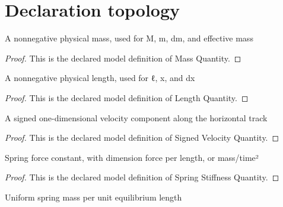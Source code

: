 \section{Declaration topology}
\begin{definition}
  \label{def:physics:phyx-mini-0237:phyxminiproblems-problemphyxmini0237-massquantity}
  A nonnegative physical mass, used for M, m, dm, and effective mass
\end{definition}
\begin{proof}
  This is the declared model definition of Mass Quantity.
\end{proof}
\begin{definition}
  \label{def:physics:phyx-mini-0237:phyxminiproblems-problemphyxmini0237-lengthquantity}
  A nonnegative physical length, used for ℓ, x, and dx
\end{definition}
\begin{proof}
  This is the declared model definition of Length Quantity.
\end{proof}
\begin{definition}
  \label{def:physics:phyx-mini-0237:phyxminiproblems-problemphyxmini0237-signedvelocityquantity}
  A signed one-dimensional velocity component along the horizontal track
\end{definition}
\begin{proof}
  This is the declared model definition of Signed Velocity Quantity.
\end{proof}
\begin{definition}
  \label{def:physics:phyx-mini-0237:phyxminiproblems-problemphyxmini0237-springstiffnessquantity}
  Spring force constant, with dimension force per length, or mass/time²
\end{definition}
\begin{proof}
  This is the declared model definition of Spring Stiffness Quantity.
\end{proof}
\begin{definition}
  \label{def:physics:phyx-mini-0237:phyxminiproblems-problemphyxmini0237-linearmassdensityquantity}
  Uniform spring mass per unit equilibrium length
\end{definition}
